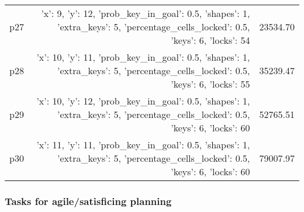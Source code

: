 \documentclass{article}
\begin{document}
\begin{center}
\begin{tabular}{@{}l|r|r@{}}
  p27&{'x': 9, 'y': 12, 'prob\_key\_in\_goal': 0.5, 'shapes': 1, 'extra\_keys': 5, 'percentage\_cells\_locked': 0.5, 'keys': 6, 'locks': 54}&23534.70\\
  p28&{'x': 10, 'y': 11, 'prob\_key\_in\_goal': 0.5, 'shapes': 1, 'extra\_keys': 5, 'percentage\_cells\_locked': 0.5, 'keys': 6, 'locks': 55}&35239.47\\
  p29&{'x': 10, 'y': 12, 'prob\_key\_in\_goal': 0.5, 'shapes': 1, 'extra\_keys': 5, 'percentage\_cells\_locked': 0.5, 'keys': 6, 'locks': 60}&52765.51\\
  p30&{'x': 11, 'y': 11, 'prob\_key\_in\_goal': 0.5, 'shapes': 1, 'extra\_keys': 5, 'percentage\_cells\_locked': 0.5, 'keys': 6, 'locks': 60}&79007.97
                            \end{tabular}
                            \end{center}
                    

                                \subsubsection*{Tasks for agile/satisficing planning}
                                
\end{document}
